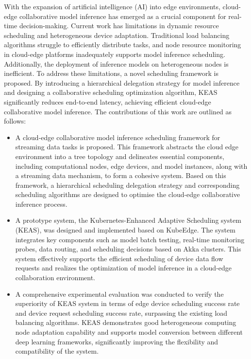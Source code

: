 \begin{abstract*}

With the expansion of artificial intelligence (AI) into edge environments, cloud-edge collaborative model inference has emerged as a crucial component for real-time decision-making. Current work has limitations in dynamic resource scheduling and heterogeneous device adaptation. Traditional load balancing algorithms struggle to efficiently distribute tasks, and node resource monitoring in cloud-edge platforms inadequately supports model inference scheduling. Additionally, the deployment of inference models on heterogeneous nodes is inefficient. To address these limitations, a novel scheduling framework is proposed. By introducing a hierarchical delegation strategy for model inference and designing a collaborative scheduling optimization algorithm, KEAS significantly reduces end-to-end latency, achieving efficient cloud-edge collaborative model inference. The contributions of this work are outlined as follows:

\begin{itemize}
    \item A cloud-edge collaborative model inference scheduling framework for streaming data tasks is proposed. This framework 
    abstracts the cloud edge environment into a tree topology and delineates essential components, including computational nodes, edge devices, and model instances, along with a streaming data  mechanism, to form a cohesive system. Based on this framework, a hierarchical scheduling delegation strategy and corresponding scheduling algorithms are designed to optimise the cloud-edge collaborative inference process.
    \item A prototype system, the Kubernetes-Enhanced Adaptive Scheduling system (KEAS), was designed and implemented based on KubeEdge. The system integrates key components such as model batch testing, real-time monitoring probes, data routing, and scheduling decisions based on Akka clusters. This system effectively supports the efficient scheduling of device data flow requests and realizes the optimization of model inference in a cloud-edge collaboration environment.
    \item A comprehensive experimental evaluation was conducted to verify the superiority of KEAS system in terms of edge device scheduling success rate and device request scheduling success rate, surpassing the existing load balancing algorithms. KEAS demonstrates good heterogeneous computing node adaptation capability and supports model conversion between different deep learning frameworks, significantly improving the flexibility and compatibility of the system.
\end{itemize}

\end{abstract*}



